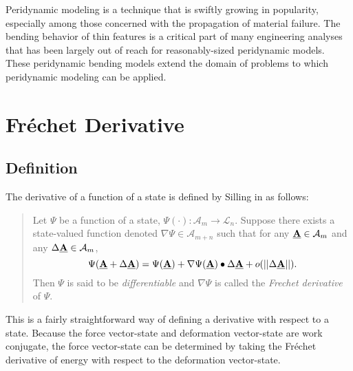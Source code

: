 Peridynamic modeling is a technique that is swiftly growing in popularity, especially among those concerned with the propagation of material failure.
The bending behavior of thin features is a critical part of many engineering analyses that has been largely out of reach for reasonably-sized peridynamic models. 
These peridynamic bending models extend the domain of problems to which peridynamic modeling can be applied.

\appendix
\chapter{Fr\'echet Derivative}
\label{sec:frechet}
\section{Definition}
The derivative of a function of a state is defined by Silling in \cite{silling2007peridynamic} as follows:
\begin{quote}
Let $\Psi$ be a function of a state, $\Psi(\cdot):\mathcal{A}_m\rightarrow\mathcal{L}_n$. Suppose there exists a state-valued function denoted $\nabla\Psi\in\mathcal{A}_{m+n}$ such that for any $\vstate{A}{}{}\in\mathcal{A}_m$ and any $\Delta\vstate{A}{}{}\in\mathcal{A}_m$,
\begin{equation}
  \Psi(\vstate{A}{}{}+\Delta\vstate{A}{}{})=\Psi(\vstate{A}{}{})+\nabla\Psi(\vstate{A}{}{})\bullet\Delta\vstate{A}{}{}+o(||\Delta\vstate{A}{}{}||).
\end{equation}
Then $\Psi$ is said to be \textit{differentiable} and $\nabla\Psi$ is called the \textit{Frechet derivative} of $\Psi$.
\end{quote}
This is a fairly straightforward way of defining a derivative with respect to a state.
Because the force vector-state and deformation vector-state are work conjugate, the force vector-state can be determined by taking the Fr\'echet derivative of energy with respect to the deformation vector-state.
